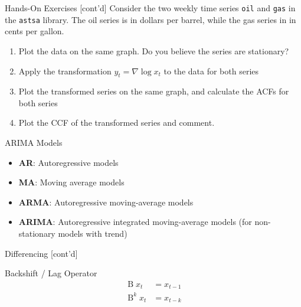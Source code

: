 \documentclass[ignorenonframetext,xcolor=x11names]{beamer}
\begin{document}
\begin{frame}{Hands-On Exercises \small [cont'd]}
Consider the two weekly time series \texttt{oil} and \texttt{gas} in the  \texttt{astsa} library. The oil series is in dollars per barrel, while the gas series in in cents per gallon.
\begin{enumerate}
   \item Plot the data on the same graph. Do you believe the series are stationary?
   \item Apply the transformation $y_t = \nabla \log x_t$ to the data for both series
   \item Plot the transformed series on the same graph, and calculate the ACFs for both series
   \item Plot the CCF of the transformed series and comment.
\end{enumerate}
\end{frame}

\begin{frame}{ARIMA Models}
\begin{itemize}
  \item \textbf{AR}: Autoregressive models
  \item \textbf{MA}: Moving average models
  \item \textbf{ARMA}: Autoregressive moving-average models
  \item \textbf{ARIMA}: Autoregressive integrated moving-average models (for non-stationary models with trend)
\end{itemize}
\end{frame}

\begin{frame}{Differencing \small [cont'd]}
\begin{block}{Backshift / Lag Operator}
\vspace{-\baselineskip}
\begin{align*}\operatorname{B} x_t &= x_{t-1} \\
\operatorname{B}^k x_t &= x_{t-k} %
 \end{align*}
 \vspace{-\baselineskip}
\end{block}
\end{frame}
\end{document}
